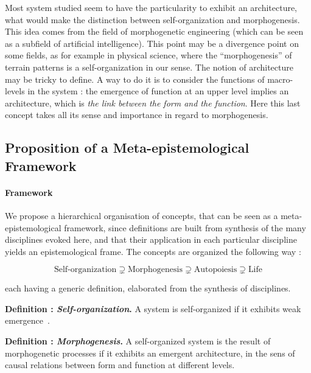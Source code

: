 \documentclass[fleqn,10pt]{wlscirep}
\begin{document}
Most system studied seem to have the particularity to exhibit an architecture, what would make the distinction between self-organization and morphogenesis. This idea comes from the field of morphogenetic engineering (which can be seen as a subfield of artificial intelligence). This point may be a divergence point on some fields, as for example in physical science, where the ``morphogenesis'' of terrain patterns is a self-organization in our sense. The notion of architecture may be tricky to define. A way to do it is to consider the functions of macro-levels in the system : the emergence of function at an upper level implies an architecture, which is \emph{the link between the form and the function}. Here this last concept takes all its sense and importance in regard to morphogenesis.


\subsection*{Proposition of a Meta-epistemological Framework}


\paragraph{Framework}

We propose a hierarchical organisation of concepts, that can be seen as a meta-epistemological framework, since definitions are built from synthesis of the many disciplines evoked here, and that their application in each particular discipline yields an epistemological frame. The concepts are organized the following way :

\begin{equation}
\textrm{Self-organization} \supsetneq \textrm{Morphogenesis} \supsetneq \textrm{Autopoiesis} \supsetneq \textrm{Life}
\end{equation}


each having a generic definition, elaborated from the synthesis of disciplines.

\medskip

\textbf{Definition : \textit{Self-organization}.} A system is self-organized if it exhibits weak emergence~\cite{bedau2002downward}.

\medskip

\textbf{Definition : \textit{Morphogenesis}.} A self-organized system is the result of morphogenetic processes if it exhibits an emergent architecture, in the sens of causal relations between form and function at different levels.
\end{document}
